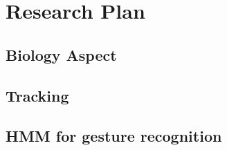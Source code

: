 \chapter{Research Plan}
\label{cha:rsp}

\section{Biology Aspect}
\label{sec:bas}

\section{Tracking}
\label{sec:trc}

\section{HMM for gesture recognition}
\label{sec:hmm}
